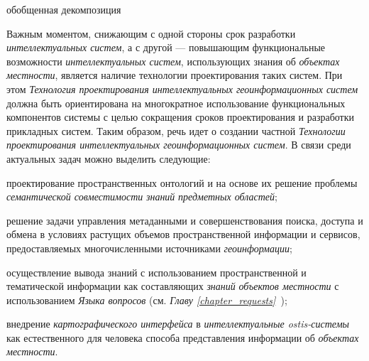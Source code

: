 \begin{SCn}
\begin{scnindent}
	\begin{scnrelfromset}{обобщенная декомпозиция}
	\end{scnrelfromset}
\end{scnindent}
\end{SCn}

Важным моментом, снижающим с одной стороны срок разработки \textit{интеллектуальных систем}, а с другой --- повышающим функциональные возможности \textit{интеллектуальных систем}, использующих знания об \textit{объектах местности}, является наличие технологии проектирования таких систем. При этом \textit{Технология проектирования интеллектуальных геоинформационных систем} должна быть ориентирована на многократное использование функциональных компонентов системы с целью сокращения сроков проектирования и разработки прикладных систем. Таким образом, речь идет о создании частной \textit{Технологии проектирования интеллектуальных геоинформационных систем}. В связи среди актуальных задач можно выделить следующие: 
\begin{textitemize}
	\item проектирование пространственных онтологий и на основе их решение проблемы \textit{семантической совместимости} \textit{знаний} \textit{предметных областей};
	\item решение задачи управления метаданными и совершенствования поиска, доступа и обмена в условиях растущих объемов пространственной информации и сервисов, предоставляемых многочисленными источниками \textit{геоинформации};
	\item осуществление вывода знаний с использованием пространственной и тематической информации как составляющих \textit{знаний} \textit{объектов местности} с использованием \textit{Языка вопросов} (см. \textit{Главу \ref{chapter_requests}~});
	\item внедрение \textit{картографического интерфейса} в \textit{интеллектуальные ostis-системы} как естественного для человека способа представления информации об \textit{объектах местности}.
\end{textitemize}


